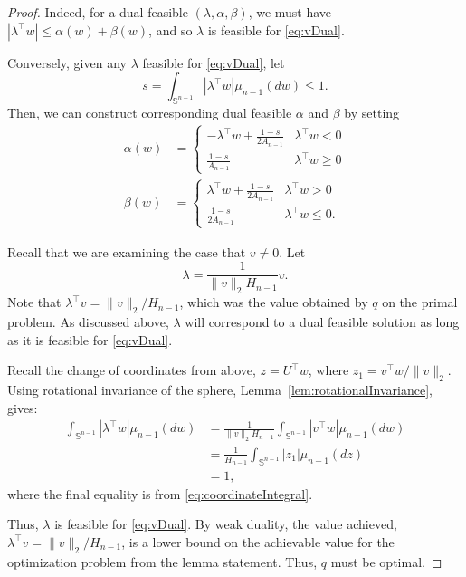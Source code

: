 \documentclass[10pt,a4paper]{amsart}
\renewcommand{\S}{\mathbb{S}}
\begin{document}
\begin{proof}
Indeed, for a dual feasible $(\lambda,\alpha,\beta)$, we must have $|\lambda^\top w|\le \alpha(w)+\beta(w)$, and so $\lambda$ is feasible for \eqref{eq:vDual}.

Conversely, given any $\lambda$ feasible for \eqref{eq:vDual}, let 
$$
s=\int_{\S^{n-1}}|\lambda^\top w|\mu_{n-1}(dw)\le 1.
$$
Then, we can construct corresponding dual feasible $\alpha$ and $\beta$ by setting
\begin{align*}
\alpha(w)&=\begin{cases}
-\lambda^\top w +\frac{1-s}{2A_{n-1}}& \lambda^\top w <0 \\
\frac{1-s}{A_{n-1}} & \lambda^\top w \ge 0
\end{cases}\\
\beta(w)&=\begin{cases}
\lambda^\top w + \frac{1-s}{2A_{n-1}} &\lambda^\top w > 0 \\
\frac{1-s}{2A_{n-1}}& \lambda^\top w \le 0.
\end{cases}
\end{align*}

Recall that we are examining the case that $v\ne 0.$
Let 
$$
\lambda = \frac{1}{\|v\|_2 H_{n-1}}v.
$$
Note that $\lambda^\top v = \|v\|_2/H_{n-1}$, which was the value obtained by $q$ on the primal problem. As discussed above, $\lambda$ will correspond to a dual feasible solution as long as it is feasible for \eqref{eq:vDual}.

Recall the change of coordinates from above, $z=U^\top w$, where $z_1=v^\top w/\|v\|_2$. Using rotational invariance of the sphere, Lemma~\ref{lem:rotationalInvariance},
gives:
\begin{align*}
\int_{\S^{n-1}}|\lambda^\top w|\mu_{n-1}(dw)&=\frac{1}{\|v\|_2 H_{n-1}}\int_{\S^{n-1}}|v^\top w|\mu_{n-1}(dw)\\
&=\frac{1}{H_{n-1}}\int_{\S^{n-1}}|z_1|\mu_{n-1}(dz) \\
&=1,
\end{align*}
where the final equality is from \eqref{eq:coordinateIntegral}.

Thus, $\lambda$ is feasible for \eqref{eq:vDual}. By weak duality, the value achieved, $\lambda^\top v=\|v\|_2/H_{n-1}$,
is a lower bound on the achievable value for the optimization problem from the lemma statement. Thus, $q$ must be  optimal. 
\end{proof}
\end{document}
